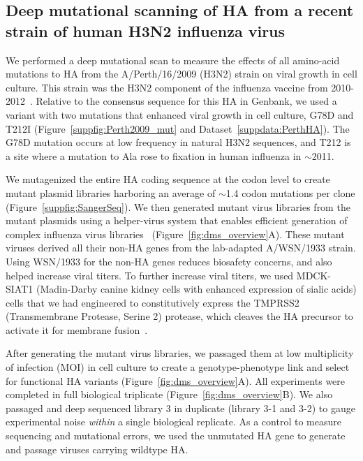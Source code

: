 \documentclass[9pt,twocolumn,twoside]{pnas-new}
\begin{document}
\subsection*{Deep mutational scanning of HA from a recent strain of human H3N2 influenza virus}
We performed a deep mutational scan to measure the effects of all amino-acid mutations to HA from the A/Perth/16/2009 (H3N2) strain on viral growth in cell culture.
This strain was the H3N2 component of the influenza vaccine from 2010-2012~\cite{who2010d,who2011}.
Relative to the consensus sequence for this HA in Genbank, we used a variant with two mutations that enhanced viral growth in cell culture, G78D and T212I (Figure~\ref{suppfig:Perth2009_mut} and Dataset~\ref{suppdata:PerthHA}).
The G78D mutation occurs at low frequency in natural H3N2 sequences, and T212 is a site where a mutation to Ala rose to fixation in human influenza in $\sim$2011.

We mutagenized the entire HA coding sequence at the codon level to create mutant plasmid libraries harboring an average of $\sim$1.4 codon mutations per clone (Figure~\ref{suppfig:SangerSeq}).
We then generated mutant virus libraries from the mutant plasmids using a helper-virus system that enables efficient generation of complex influenza virus libraries~\cite{doud2016accurate} (Figure~\ref{fig:dms_overview}A).
These mutant viruses derived all their non-HA genes from the lab-adapted A/WSN/1933 strain.
Using WSN/1933 for the non-HA genes reduces biosafety concerns, and also helped increase viral titers.
To further increase viral titers, we used MDCK-SIAT1 (Madin-Darby canine kidney cells with enhanced expression of sialic acids) cells that we had engineered to constitutively express the TMPRSS2 (Transmembrane Protease, Serine 2) protease, which cleaves the HA precursor to activate it for membrane fusion~\cite{bottcher2006proteolytic, bottcher2010cleavage}.

After generating the mutant virus libraries, we passaged them at low multiplicity of infection (MOI) in cell culture to create a genotype-phenotype link and select for functional HA variants (Figure~\ref{fig:dms_overview}A).
All experiments were completed in full biological triplicate (Figure~\ref{fig:dms_overview}B).
We also passaged and deep sequenced library 3 in duplicate (library 3-1 and 3-2) to gauge experimental noise \textit{within} a single biological replicate.
As a control to measure sequencing and mutational errors, we used the unmutated HA gene to generate and passage viruses carrying wildtype HA.
\end{document}
